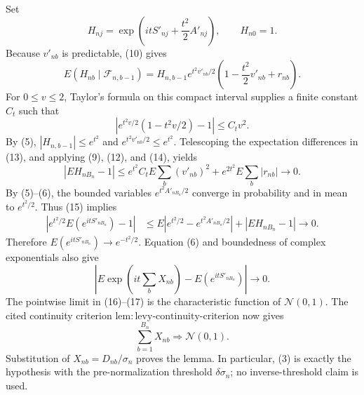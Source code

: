 Set
\[
H_{nj}=\exp\!\left(itS'_{nj}+\frac{t^2}{2}A'_{nj}\right),
\qquad H_{n0}=1.
\]
Because \(v'_{nb}\) is predictable, (10) gives
\[
E(H_{nb}\mid\mathcal F_{n,b-1})
=H_{n,b-1}e^{t^2v'_{nb}/2}
\left(1-\frac{t^2}{2}v'_{nb}+r_{nb}\right).
\tag{13}
\]
For \(0\le v\le2\), Taylor's formula on this compact interval supplies a finite constant \(C_t\) such that
\[
\left|e^{t^2v/2}(1-t^2v/2)-1\right|\le C_tv^2.
\tag{14}
\]
By (5), \(|H_{n,b-1}|\le e^{t^2}\) and \(e^{t^2v'_{nb}/2}\le e^{t^2}\). Telescoping the expectation differences in (13), and applying (9), (12), and (14), yields
\[
|EH_{nB_n}-1|
\le e^{t^2}C_tE\sum_b(v'_{nb})^2
+e^{2t^2}E\sum_b|r_{nb}|\longrightarrow0.
\tag{15}
\]
By (5)--(6), the bounded variables \(e^{t^2A'_{nB_n}/2}\) converge in probability and in mean to \(e^{t^2/2}\). Thus (15) implies
\[
\begin{aligned}
\left|e^{t^2/2}E(e^{itS'_{nB_n}})-1\right|
&\le E\left|e^{t^2/2}-e^{t^2A'_{nB_n}/2}\right|
+|EH_{nB_n}-1|\longrightarrow0.
\end{aligned}
\tag{16}
\]
Therefore \(E(e^{itS'_{nB_n}})\to e^{-t^2/2}\). Equation (6) and boundedness of complex exponentials also give
\[
\left|E\exp\!\left(it\sum_bX_{nb}\right)-E(e^{itS'_{nB_n}})\right|\longrightarrow0.
\tag{17}
\]
The pointwise limit in (16)--(17) is the characteristic function of \(\mathcal N(0,1)\). The cited continuity criterion \(\mathrm{lem:levy\text{-}continuity\text{-}criterion}\) now gives
\[
\sum_{b=1}^{B_n}X_{nb}\Rightarrow\mathcal N(0,1).
\]
Substitution of \(X_{nb}=D_{nb}/\sigma_n\) proves the lemma. In particular, (3) is exactly the hypothesis with the pre-normalization threshold \(\delta\sigma_n\); no inverse-threshold claim is used.